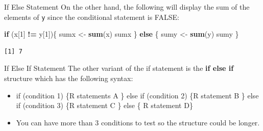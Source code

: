 \documentclass[
  ignorenonframetext,
]{beamer}
\newenvironment{Shaded}{\begin{snugshade}}{\end{snugshade}}
\newcommand{\ControlFlowTok}[1]{\textcolor[rgb]{0.13,0.29,0.53}{\textbf{#1}}}
\newcommand{\DecValTok}[1]{\textcolor[rgb]{0.00,0.00,0.81}{#1}}
\newcommand{\FunctionTok}[1]{\textcolor[rgb]{0.13,0.29,0.53}{\textbf{#1}}}
\newcommand{\NormalTok}[1]{#1}
\newcommand{\OtherTok}[1]{\textcolor[rgb]{0.56,0.35,0.01}{#1}}
\newcommand{\SpecialCharTok}[1]{\textcolor[rgb]{0.81,0.36,0.00}{\textbf{#1}}}
\begin{document}
\begin{frame}[fragile]{If Else Statement}
\label{if-else-statement-1}
On the other hand, the following will display the sum of the elements of
\texttt{y} since the conditional statement is FALSE:

\small

\begin{Shaded}
\begin{Highlighting}[]
\ControlFlowTok{if}\NormalTok{ (x[}\DecValTok{1}\NormalTok{] }\SpecialCharTok{!=}\NormalTok{ y[}\DecValTok{1}\NormalTok{])\{}
\NormalTok{  sumx }\OtherTok{\textless{}{-}} \FunctionTok{sum}\NormalTok{(x)}
\NormalTok{  sumx}
\NormalTok{\} }\ControlFlowTok{else}\NormalTok{ \{}
\NormalTok{  sumy }\OtherTok{\textless{}{-}} \FunctionTok{sum}\NormalTok{(y)}
\NormalTok{  sumy}
\NormalTok{\}}
\end{Highlighting}
\end{Shaded}

\begin{verbatim}
[1] 7
\end{verbatim}

\normalsize
\end{frame}

\begin{frame}{If Else If Statement}
\label{if-else-if-statement}
The other variant of the if statement is the \textbf{if else if}
structure which has the following syntax:

\begin{itemize}
\item
  if (condition 1) \{R statements A \} else if (condition 2) \{R
  statement B \} else if (condition 3) \{R statement C \} else \{ R
  statement D\}
\item
  You can have more than 3 conditions to test so the structure could be
  longer.
\end{itemize}
\end{frame}
\end{document}
